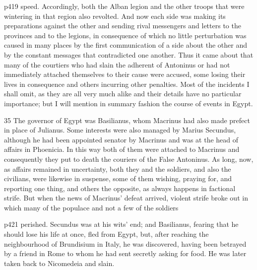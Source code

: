 p419 speed. Accordingly, both the Alban legion and the other troops that were wintering in that region also revolted. And now each side was making its preparations against the other and sending rival messengers and letters to the provinces and to the legions, in consequence of which no little perturbation was caused in many places by the first communication of a side about the other and by the constant messages that contradicted one another. Thus it came about that many of the courtiers who had slain the adherent of Antoninus or had not immediately attached themselves to their cause were accused, some losing their lives in consequence and others incurring other penalties. Most of the incidents I shall omit, as they are all very much alike and their details have no particular importance; but I will mention in summary fashion the course of events in Egypt.

35
The governor of Egypt was Basilianus, whom Macrinus had also made prefect in place of Julianus. Some interests were also managed by Marius Secundus, although he had been appointed senator by Macrinus and was at the head of affairs in Phoenicia. In this way both of them were attached to Macrinus and consequently they put to death the couriers of the False Antoninus. As long, now, as affairs remained in uncertainty, both they and the soldiers, and also the civilians, were likewise in suspense, some of them wishing, praying for, and reporting one thing, and others the opposite, as always happens in factional strife. But when the news of Macrinus' defeat arrived, violent strife broke out in which many of the populace and not a few of the soldiers

p421 perished. Secundus was at his wits' end; and Basilianus, fearing that he should lose his life at once, fled from Egypt, but, after reaching the neighbourhood of Brundisium in Italy, he was discovered, having been betrayed by a friend in Rome to whom he had sent secretly asking for food. He was later taken back to Nicomedeia and slain.

